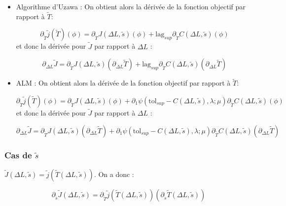 \documentclass[11pt,a4paper]{article}
\begin{document}
\begin{itemize}
	\item Algorithme d'Uzawa : On obtient alors la dérivée de la fonction objectif par rapport à $\tilde{T}$:
	
	\begin{equation}
	\partial_{\tilde{T}}\tilde{j}(\tilde{T})(\phi)= \partial_{\tilde{T}}J(\Delta L,\tilde{s})(\phi)+ \textrm{lag}_{sup} \partial_{\tilde{T}}C(\Delta L,\tilde{s})(\phi)
	\end{equation}
	et donc la dérivée pour $\tilde{J}$ par rapport à $\Delta L$ :
	
	\begin{equation}
	\partial_{\Delta L}\tilde{J}= \partial_{\tilde{T}}J(\Delta L,\tilde{s})(\partial_{\Delta L}\tilde{T})+ \textrm{lag}_{sup} \partial_{\tilde{T}}C(\Delta L,\tilde{s})(\partial_{\Delta L}\tilde{T})
	\end{equation}
	
	\item ALM : On obtient alors la dérivée de la fonction objectif par rapport à $\tilde{T}$:
	
	\begin{equation}
	\partial_{\tilde{T}}\tilde{j}(\tilde{T})(\phi)= \partial_{\tilde{T}}J(\Delta L,\tilde{s})(\phi)+\partial_1\psi\left(\textrm{tol}_{sup}-C(\Delta L,\tilde{s}),\lambda;\mu\right) \partial_{\tilde{T}}C(\Delta L,\tilde{s})(\phi)
	\end{equation}
	et donc la dérivée pour $\tilde{J}$ par rapport à $\Delta L$ :
	
	\begin{equation}
	\partial_{\Delta L}\tilde{J}= \partial_{\tilde{T}}J(\Delta L,\tilde{s})(\partial_{\Delta L}\tilde{T})+ \partial_1\psi\left(\textrm{tol}_{sup}-C(\Delta L,\tilde{s}),\lambda;\mu\right) \partial_{\tilde{T}}C(\Delta L,\tilde{s})(\partial_{\Delta L}\tilde{T})
	\end{equation}
\end{itemize}


\subsubsection*{Cas de $\tilde{s}$}

$\tilde{J}(\Delta L,\tilde{s})=\tilde{j}(\tilde{T}(\Delta L,\tilde{s}))$. On a donc :

\begin{equation}
\partial_{\tilde{s}}\tilde{J}(\Delta L,\tilde{s})=\partial_{\tilde{T}}\tilde{j}(\tilde{T}(\Delta L,\tilde{s}))(\partial_{\tilde{s}}\tilde{T}(\Delta L,\tilde{s}))
\end{equation}
\end{document}
